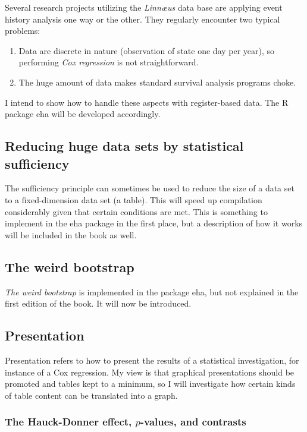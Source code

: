 \documentclass[a4paper,11pt]{article}
\begin{document}
Several research projects utilizing the \emph{Linn{\ae}us} data base are
applying event history analysis one way or the other. They regularly
encounter two typical problems:

\begin{enumerate}

\item Data are discrete in nature (observation of state one day per year),
  so performing \emph{Cox regression} is not straightforward.
\item The huge amount of data makes standard survival analysis programs
  choke.
\end{enumerate}  

I intend to show how to handle these aspects with register-based data. The
R package eha \citep{eha} will be developed accordingly.

\subsection{Reducing huge data sets by statistical sufficiency}

The sufficiency principle can sometimes be used to reduce the size of a data set 
to a fixed-dimension data set (a table). This will speed up compilation considerably
given that certain conditions are met. This is something to implement in the eha
package in the first place, but a description of how it works will be included 
in the book as well.

\subsection{The weird bootstrap}

\emph{The weird bootstrap} \citep[p. 323]{abgk93} is implemented in the package eha, but 
not explained in the first edition of the book. It will now be introduced.

\subsection{Presentation}

Presentation refers to how to present the results of a statistical
investigation, for instance of a Cox regression. My view is that graphical
presentations should be promoted and tables kept to a minimum, so I will
investigate how certain kinds of table content can be translated into a graph.

\subsubsection{The Hauck-Donner effect, $p$-values, and contrasts}
\end{document}
